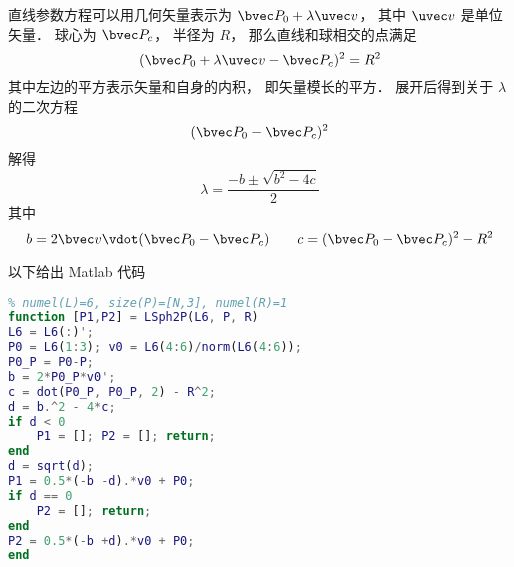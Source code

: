 

直线参数方程可以用几何矢量表示为 $\bvec P_0 + \lambda \uvec v$， 其中 $\uvec v$ 是单位矢量． 球心为 $\bvec P_c$， 半径为 $R$， 那么直线和球相交的点满足
\begin{equation}
(\bvec P_0 + \lambda \uvec v - \bvec P_c)^2 = R^2
\end{equation}
其中左边的平方表示矢量和自身的内积， 即矢量模长的平方． 展开后得到关于 $\lambda$ 的二次方程
\begin{equation}
(\bvec P_0 - \bvec P_c)^2
\end{equation}
解得
\begin{equation}
\lambda = \frac{-b \pm \sqrt{b^2 - 4c}}{2}
\end{equation}
其中
\begin{equation}
b = 2\bvec v \vdot (\bvec P_0 - \bvec P_c)
\qquad
c = (\bvec P_0 - \bvec P_c)^2 - R^2
\end{equation}

以下给出 Matlab 代码
\begin{lstlisting}[language=matlab]
% 计算直线和球的焦点
% numel(L)=6, size(P)=[N,3], numel(R)=1
function [P1,P2] = LSph2P(L6, P, R)
L6 = L6(:)';
P0 = L6(1:3); v0 = L6(4:6)/norm(L6(4:6));
P0_P = P0-P;
b = 2*P0_P*v0';
c = dot(P0_P, P0_P, 2) - R^2;
d = b.^2 - 4*c;
if d < 0
    P1 = []; P2 = []; return;
end
d = sqrt(d);
P1 = 0.5*(-b -d).*v0 + P0;
if d == 0
    P2 = []; return;
end
P2 = 0.5*(-b +d).*v0 + P0;
end
\end{lstlisting}
